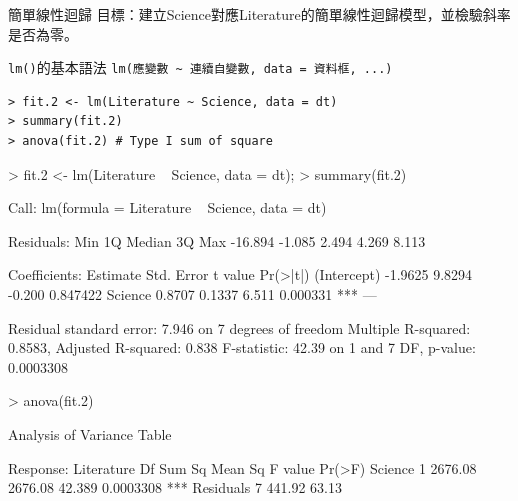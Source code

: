 \documentclass[14pt, aspectratio=43]{beamer}
\begin{document}
%


\begin{frame}{簡單線性迴歸}
目標：建立Science對應Literature的簡單線性迴歸模型，並檢驗斜率是否為零。
\begin{block}{\texttt{lm()}的基本語法}
\verb+lm(應變數 ~ 連續自變數, data = 資料框, ...)+
\end{block}
\begin{verbatim}
> fit.2 <- lm(Literature ~ Science, data = dt)
> summary(fit.2)
> anova(fit.2) # Type I sum of square
\end{verbatim}

\framebreak

\begin{RC}
> fit.2 <- lm(Literature ~ Science, data = dt); 
> summary(fit.2)
\end{RC}
\begin{R}
Call:
lm(formula = Literature ~ Science, data = dt)

Residuals:
    Min      1Q  Median      3Q     Max 
-16.894  -1.085   2.494   4.269   8.113 

Coefficients:
            Estimate Std. Error t value Pr(>|t|)    
(Intercept)  -1.9625     9.8294  -0.200 0.847422    
Science       0.8707     0.1337   6.511 0.000331 ***
---

Residual standard error: 7.946 on 7 degrees of freedom
Multiple R-squared:  0.8583,	Adjusted R-squared:  0.838 
F-statistic: 42.39 on 1 and 7 DF,  p-value: 0.0003308
\end{R}

\framebreak

\begin{RC}
> anova(fit.2)
\end{RC}
\begin{R}
Analysis of Variance Table

Response: Literature
          Df  Sum Sq Mean Sq F value    Pr(>F)    
Science    1 2676.08 2676.08  42.389 0.0003308 ***
Residuals  7  441.92   63.13                      
\end{R}
\end{frame}
\end{document}
